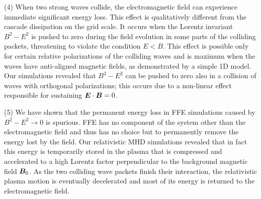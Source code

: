 (4) When two strong \alfven waves collide, the electromagnetic field can experience immediate significant energy loss. This effect is qualitatively different from the cascade dissipation on the grid scale. It occurs when the Lorentz invariant $B^2-E^2$ is pushed to zero during the field evolution in some parts of the colliding packets, threatening to violate the condition $E<B$. This effect is possible only for certain relative polarizations of the colliding waves and is maximum when the waves have anti-aligned magnetic fields, as demonstrated by a simple 1D model. Our simulations revealed that $B^2-E^2$ can be pushed to zero also in a collision of waves with orthogonal polarizations; this occurs due to a non-linear effect responsible for sustaining $\boldsymbol{E}\cdot\boldsymbol{B}=0$.

(5) We have shown that the permanent energy loss in FFE simulations caused by $B^2-E^2\rightarrow 0$ is spurious.
FFE has no component of the system other than the electromagnetic field and thus has no choice but to permanently remove the energy lost by the field. Our relativistic MHD simulations revealed that in fact this energy is temporarily stored in the
plasma that is compressed and
accelerated to a high Lorentz factor perpendicular to the background magnetic field $\boldsymbol{B}_0$.
As the two colliding wave packets finish their interaction, the relativistic plasma motion is eventually decelerated and most of its energy is returned to the electromagnetic field. 

